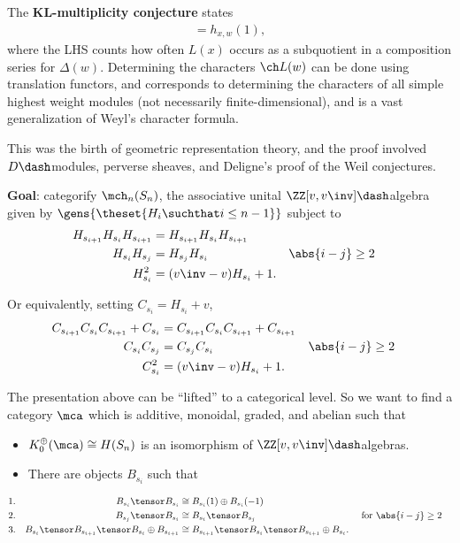 The \textbf{KL-multiplicity conjecture} states
\begin{align*} 
[\Delta(w) : L(x)] = h_{x, w}(1)
,\end{align*} where the LHS counts how often \(L(x)\) occurs as a
subquotient in a composition series for \(\Delta(w)\). Determining the
characters \(\ch L(w)\) can be done using translation functors, and
corresponds to determining the characters of all simple highest weight
modules (not necessarily finite-dimensional), and is a vast
generalization of Weyl's character formula.

This was the birth of geometric representation theory, and the proof
involved \(D\dash\)modules, perverse sheaves, and Deligne's proof of the
Weil conjectures.

\textbf{Goal}: categorify \(\mch_n(S_n)\), the associative unital
\(\ZZ[v, v\inv]\dash\)algebra given by
\(\gens{\theset{H_i \suchthat i\leq n-1}}\) subject to
\begin{align*}
H_{s_{i+1}}
H_{s_{i}}
H_{s_{i+1}} &= 
H_{s_{i+1}}
H_{s_{i}}
H_{s_{i+1}} \\
H_{s_{i}}
H_{s_{j}}
&=
H_{s_{j}}
H_{s_{i}} 
&& \abs{i-j} \geq 2 \\
H_{s_{i}}^2 &= (v\inv - v) H_{s_i} + 1
.\end{align*}

Or equivalently, setting \(C_{s_i} = H_{s_i} + v\),
\begin{align*}
C_{s_{i+1}}
C_{s_{i}}
C_{s_{i+1}}  + C_{s_i} &= 
C_{s_{i+1}}
C_{s_{i}}
C_{s_{i+1}} + C_{s_{i+1}} \\
C_{s_{i}}
C_{s_{j}}
&=
C_{s_{j}}
C_{s_{i}}  
&&\abs{i-j} \geq 2 \\
C_{s_{i}}^2 
&= (v\inv - v) H_{s_i} + 1
.\end{align*}

\begin{remark}

The presentation above can be ``lifted'' to a categorical level. So we
want to find a category \(\mca\) which is additive, monoidal, graded,
and abelian such that

\begin{itemize}
\tightlist
\item
  \(K_0^\oplus(\mca) \cong H(S_n)\) is an isomorphism of
  \(\ZZ[v, v\inv]\dash\)algebras.
\item
  There are objects \(B_{s_i}\) such that
\end{itemize}

\begin{align*}  
1. && B_{s_i} \tensor B_{s_i} &\cong B_{s_i}(1) \oplus B_{s_i}(-1) \\
2. && B_{s_j} \tensor B_{s_i} &\cong B_{s_i} \tensor B_{s_j} && \text{ for } \abs{i-j} \geq 2 \\
3. && B_{s_i} \tensor B_{s_{i+1}} \tensor B_{s_i} \oplus B_{s_{i+1}} &\cong B_{s_{i+1}} \tensor B_{s_{i}} \tensor B_{s_{i+1}} \oplus B_{s_{i}}
.\end{align*}

\end{remark}

